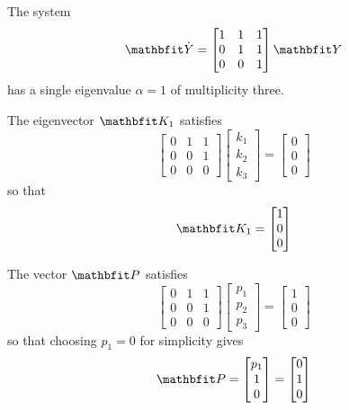 \begin{example}
The system
$$\vect{\dot{Y}}=\begin{bmatrix}1&1&1\\0&1&1\\0&0&1\end{bmatrix}\vect{Y}$$
has a single eigenvalue $\alpha=1$ of multiplicity three.

The eigenvector $\vect{K}_1$ satisfies
$$\begin{bmatrix}0&1&1\\0&0&1\\0&0&0\end{bmatrix}
\begin{bmatrix}k_1\\k_2\\k_3\end{bmatrix}=\begin{bmatrix}0\\0\\0
\end{bmatrix}$$
so that
$$\vect{K}_1=\begin{bmatrix}1\\0\\0\end{bmatrix}$$

The vector $\vect{P}$ satisfies
$$\begin{bmatrix}0&1&1\\0&0&1\\0&0&0\end{bmatrix}
\begin{bmatrix}p_1\\p_2\\p_3\end{bmatrix}=\begin{bmatrix}1\\0\\0
\end{bmatrix}$$
so that choosing $p_1=0$ for simplicity gives
$$\vect{P}=\begin{bmatrix}p_1\\1\\0\end{bmatrix}
=\begin{bmatrix}0\\1\\0\end{bmatrix}$$


\end{example}
